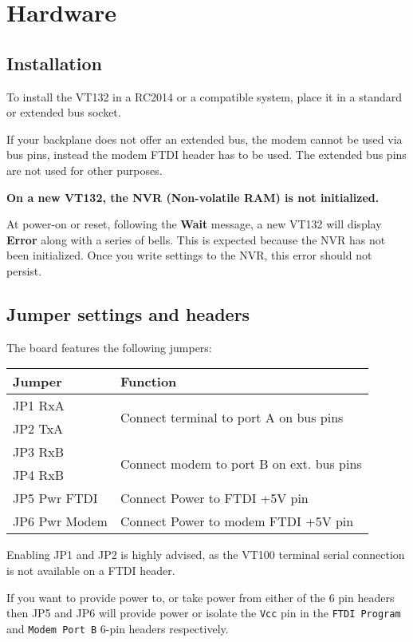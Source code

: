 \appendix

\chapter{Hardware}

\section{Installation}

To install the VT132 in a RC2014 or a compatible system, place it in a standard or extended bus socket.

If your backplane does not offer an extended bus, the modem cannot be used via bus pins, instead the modem FTDI header has to be used.
The extended bus pins are not used for other purposes.

\textbf{On a new VT132, the NVR (Non-volatile RAM) is not initialized.}

At power-on or reset, following the \textbf{Wait} message, a new VT132 will display \textbf{Error} along with a series of bells.
This is expected because the NVR has not been initialized.
Once you write settings to the NVR, this error should not persist.

\section{Jumper settings and headers}

The board features the following jumpers:

\begin{tabular}{p{7em} | p{}}
\hline
\textbf{Jumper} & \textbf{Function} \\
\hline
JP1 RxA & \multirow{2}{*}{Connect terminal to port A on bus pins} \\
JP2 TxA \\
\hline
JP3 RxB & \multirow{2}{*}{Connect modem to port B on ext. bus pins} \\
JP4 RxB \\
\hline
JP5 Pwr FTDI & Connect Power to FTDI +5V pin \\
\hline
JP6 Pwr Modem & Connect Power to modem FTDI +5V pin \\
\hline
\end{tabular}

Enabling JP1 and JP2 is highly advised, as the VT100 terminal serial connection is not available on a FTDI header.

If you want to provide power to, or take power from either of the 6 pin headers then JP5 and JP6 will provide power
or isolate the \texttt{Vcc} pin in the \texttt{FTDI Program} and \texttt{Modem Port B} 6-pin headers respectively.


